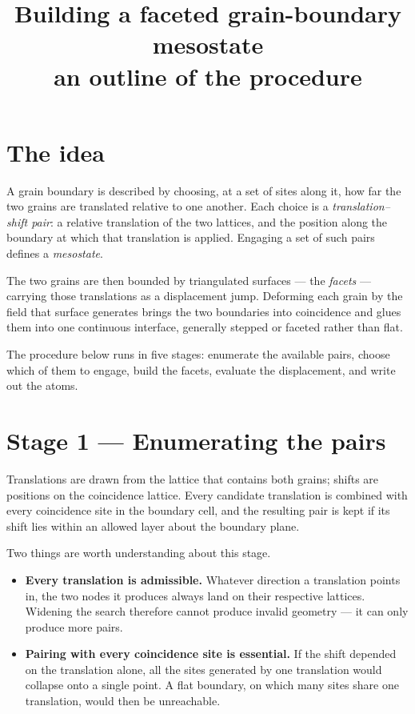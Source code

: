 \documentclass[11pt]{article}
\title{Building a faceted grain-boundary mesostate\\
       \large an outline of the procedure}
\date{}
\begin{document}
\maketitle

\section*{The idea}

A grain boundary is described by choosing, at a set of sites along it, how far
the two grains are translated relative to one another. Each choice is a
\emph{translation--shift pair}: a relative translation of the two lattices, and
the position along the boundary at which that translation is applied. Engaging
a set of such pairs defines a \emph{mesostate}.

The two grains are then bounded by triangulated surfaces --- the \emph{facets}
--- carrying those translations as a displacement jump. Deforming each grain by
the field that surface generates brings the two boundaries into coincidence and
glues them into one continuous interface, generally stepped or faceted rather
than flat.

The procedure below runs in five stages: enumerate the available pairs, choose
which of them to engage, build the facets, evaluate the displacement, and write
out the atoms.

\section*{Stage 1 --- Enumerating the pairs}

Translations are drawn from the lattice that contains both grains; shifts are
positions on the coincidence lattice. Every candidate translation is combined
with every coincidence site in the boundary cell, and the resulting pair is kept
if its shift lies within an allowed layer about the boundary plane.

Two things are worth understanding about this stage.

\begin{itemize}
  \item \textbf{Every translation is admissible.} Whatever direction a
        translation points in, the two nodes it produces always land on their
        respective lattices. Widening the search therefore cannot produce
        invalid geometry --- it can only produce more pairs.
  \item \textbf{Pairing with every coincidence site is essential.} If the shift
        depended on the translation alone, all the sites generated by one
        translation would collapse onto a single point. A flat boundary, on
        which many sites share one translation, would then be unreachable.
\end{itemize}
\end{document}
